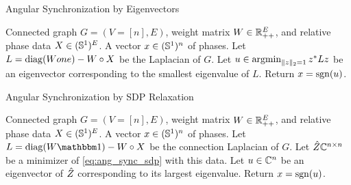 \begin{algorithm}[htbp]
\renewcommand{\algorithmicrequire}{\textbf{Input:}}
\renewcommand{\algorithmicensure}{\textbf{Output:}}
\caption{Angular Synchronization by Eigenvectors}
\label{alg:ang_sync_eig}
\begin{algorithmic}[1]
  \REQUIRE Connected graph $G = (V = [n], E)$, weight matrix $W \in \mathbb{R}_{++}^E$, and relative phase data $X \in (\mathbb{S}^1)^E$.
  \ENSURE A vector $x \in (\mathbb{S}^1)^n$ of phases.
  \STATE Let $L = \operatorname{diag}(W one) - W \circ X$ be the Laplacian of $G$.
  \STATE Let $u \in \operatorname*{argmin}_{\lVert z\rVert_2 = 1} z^* L z$ be an eigenvector corresponding to the smallest eigenvalue of $L$.
  \STATE Return $x = \operatorname{sgn}(u)$.
\end{algorithmic}
\end{algorithm}

\begin{algorithm}[htbp]
\renewcommand{\algorithmicrequire}{\textbf{Input:}}
\renewcommand{\algorithmicensure}{\textbf{Output:}}
\caption{Angular Synchronization by SDP Relaxation}
\label{alg:ang_sync_sdp}
\begin{algorithmic}[1]
  \REQUIRE Connected graph $G = (V = [n], E)$, weight matrix $W \in \mathbb{R}_{++}^E$, and relative phase data $X \in (\mathbb{S}^1)^E$.
  \ENSURE A vector $x \in (\mathbb{S}^1)^n$ of phases.
  \STATE Let $L = \diag(W \one) - W \circ X$ be the connection Laplacian of $G$.
  \STATE Let $\hat{Z} \mathbb{C}^{n \times n}$ be a minimizer of \eqref{eq:ang_sync_sdp} with this data.
  \STATE Let $u \in \mathbb{C}^n$ be an eigenvector of $\hat{Z}$ corresponding to its largest eigenvalue.
  \STATE Return $x = \operatorname{sgn}(u)$.
\end{algorithmic}
\end{algorithm}




